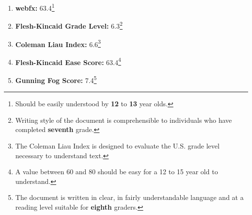 \renewcommand{\thefootnote}{\alph{footnote}}
\begin{enumerate}[itemsep = 0.1 pt]

      \item{
            \textbf{webfx:} 63.4\footnote{Should be easily understood by \textbf{12} to \textbf{13} year olds.}
            }
      \item{
            \textbf{Flesh-Kincaid Grade Level:} 6.3\footnote{Writing style of the document is comprehensible to individuals who have completed \textbf{seventh} grade.}
            }
        \item{
         \textbf{Coleman Liau Index:} 6.6\footnote{The Coleman Liau Index is designed to evaluate the U.S. grade level necessary to understand text.}
        }
      \item{
            \textbf{Flesh-Kincaid Ease Score:} 63.4\footnote{A value between 60 and 80 should be easy for a 12 to 15 year old to understand.}
            }
      \item{
            \textbf{Gunning Fog Score:} 7.4\footnote{The document is written in clear, in fairly understandable language and at a reading level suitable for \textbf{eighth} graders.}
            }
\end{enumerate}